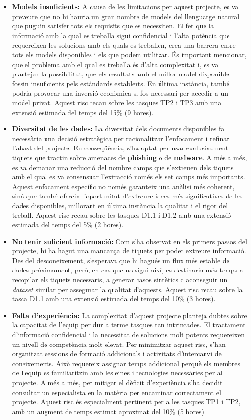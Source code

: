 \begin{itemize}
    \item \textbf{Models insuficients:} A causa de les limitacions per aquest projecte, es va preveure que no hi hauria un gran nombre de models del llenguatge natural que puguin satisfer tots els requisits que es necessiten. El fet que la informació amb la qual es treballa sigui confidencial i l'alta potència que requereixen les solucions amb els quals es treballen, crea una barrera entre tots els models disponibles i els que podem utilitzar. És important mencionar, que el problema amb el qual es treballa és d'alta complexitat i, es va plantejar la possibilitat, que els resultats amb el millor model disponible fossin insuficients pels estàndards establerts. En última instància, també podria provocar una inversió econòmica si fos necessari per accedir a un model privat. Aquest risc recau sobre les tasques TP2 i TP3 amb una extensió estimada del temps del 15\% (9 hores).
    \item \textbf{Diversitat de les dades:} La diversitat dels documents disponibles fa necessària una decisió estratègica per racionalitzar l'enfocament i refinar l'abast del projecte. En conseqüència, s'ha optat per usar exclusivament tiquets que tractin sobre amenaces de \textbf{phishing} o de \textbf{malware}. A més a més, es va demanar una reducció del nombre camps que s'extreuen dels tiquets amb el qual es va consensuar l'extracció només els set camps més importants. Aquest enfocament específic no només garanteix una anàlisi més coherent, sinó que també ofereix l'oportunitat d'extreure idees més significatives de les dades disponibles, millorant en última instància la qualitat i el rigor del treball. Aquest risc recau sobre les tasques D1.1 i D1.2 amb una extensió estimada del temps del 5\% (2 hores).
    \item \textbf{No tenir suficient informació:} Com s'ha observat en els primers passos del projecte, hi ha hagut una mancança de tiquets per poder extreure informació. Des del desconeixement, s'esperava que hi hagués un flux més estable de dades pròximament, però, en cas que no sigui així, es destinaria més temps a recopilar els tiquets necessaris, a generar casos sintètics o aconseguir un \textit{dataset} similar per assegurar la qualitat d'aquests. Aquest risc recau sobre la tasca D1.1 amb una extensió estimada del temps del 10\% (3 hores).
    \item \textbf{Falta d'experiència:} La complexitat d'aquest projecte planteja dubtes sobre la capacitat de l'equip per dur a terme tasques tan intrincades. El tractament d'informació confidencial i la necessitat de solucions molt potents requereixen un nivell de competència molt elevat. Per minimitzar aquest risc, s'han organitzat sessions de formació addicionals i activitats d'intercanvi de coneixements. Això requereix assignar temps addicional perquè els membres de l'equip es familiaritzin amb les eines i tecnologies necessàries per al projecte. A més a més, per mitigar el dèficit d'experiència s'ha decidit consultar un especialista en la matèria per encaminar correctament el projecte. Aquest risc és especialment pertinent per a les tasques TP1 i TP2, amb un augment de temps estimat aproximat del 10\% (5 hores).
\end{itemize}
